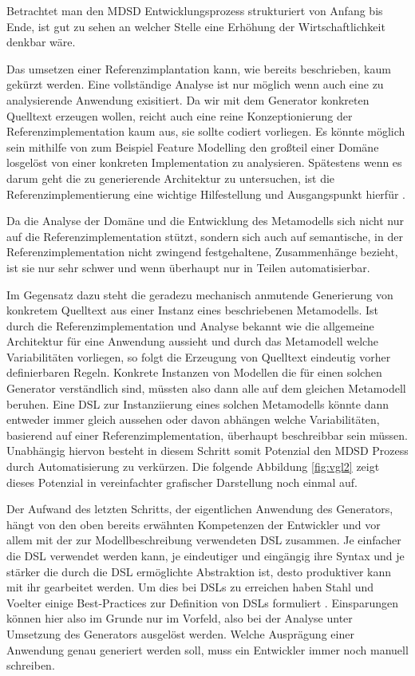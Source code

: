 \documentclass[12pt,oneside,a4paper,parskip]{scrbook}
\begin{document}
Betrachtet man den MDSD Entwicklungsprozess strukturiert von Anfang bis Ende, ist gut zu sehen an welcher Stelle eine Erhöhung der Wirtschaftlichkeit denkbar wäre. 

Das umsetzen einer Referenzimplantation kann, wie bereits beschrieben, kaum gekürzt werden. Eine vollständige Analyse ist nur möglich wenn auch eine zu analysierende Anwendung exisitiert. Da wir mit dem Generator konkreten Quelltext erzeugen wollen, reicht auch eine reine Konzeptionierung der Referenzimplementation kaum aus, sie sollte codiert vorliegen. Es könnte möglich sein mithilfe von zum Beispiel Feature Modelling den großteil einer Domäne losgelöst von einer konkreten Implementation zu analysieren. Spätestens wenn es darum geht die zu generierende Architektur zu untersuchen, ist die Referenzimplementierung eine wichtige Hilfestellung und Ausgangspunkt hierfür \cite[S. 123f.]{stahl2007}.

Da die Analyse der Domäne und die Entwicklung des Metamodells sich nicht nur auf die Referenzimplementation stützt, sondern sich auch auf semantische, in der Referenzimplementation nicht zwingend festgehaltene, Zusammenhänge bezieht, ist sie nur sehr schwer und wenn überhaupt nur in Teilen automatisierbar. 

Im Gegensatz dazu steht die geradezu mechanisch anmutende Generierung von konkretem Quelltext aus einer Instanz eines beschriebenen Metamodells. Ist durch die Referenzimplementation und Analyse bekannt wie die allgemeine Architektur für eine Anwendung aussieht und durch das Metamodell welche Variabilitäten vorliegen, so folgt die Erzeugung von Quelltext eindeutig vorher definierbaren Regeln. Konkrete Instanzen von Modellen die für einen solchen Generator verständlich sind, müssten also dann alle auf dem gleichen Metamodell beruhen. Eine DSL zur Instanziierung eines solchen Metamodells könnte dann entweder immer gleich aussehen oder davon abhängen welche Variabilitäten, basierend auf einer Referenzimplementation, überhaupt beschreibbar sein müssen. Unabhängig hiervon besteht in diesem Schritt somit Potenzial den MDSD Prozess durch Automatisierung zu verkürzen. Die folgende Abbildung \ref{fig:vgl2} zeigt dieses Potenzial in vereinfachter grafischer Darstellung noch einmal auf.

Der Aufwand des letzten Schritts, der eigentlichen Anwendung des Generators, hängt von den oben bereits erwähnten Kompetenzen der Entwickler und vor allem mit der zur Modellbeschreibung verwendeten DSL zusammen. Je einfacher die DSL verwendet werden kann, je eindeutiger und eingängig ihre Syntax und je stärker die durch die DSL ermöglichte Abstraktion ist, desto produktiver kann mit ihr gearbeitet werden. Um dies bei DSLs zu erreichen haben Stahl und Voelter einige Best-Practices zur Definition von DSLs formuliert \cite[S. 113]{stahl2007}. Einsparungen können hier also im Grunde nur im Vorfeld, also bei der Analyse unter Umsetzung des Generators ausgelöst werden. Welche Ausprägung einer Anwendung genau generiert werden soll, muss ein Entwickler immer noch manuell schreiben.
\end{document}

